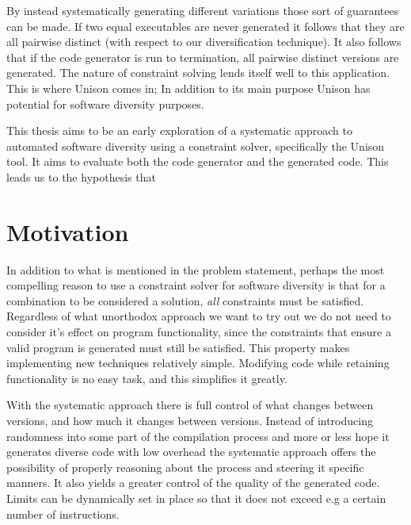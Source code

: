 By instead systematically generating different variations those sort of guarantees can be
made. If two equal executables are never generated it follows that they are all pairwise
distinct (with respect to our diversification technique). It also follows that if the
code generator is run to termination, all pairwise distinct versions are generated.
The nature of constraint solving lends itself well to this application. This is where
Unison comes in; In addition to its main purpose Unison has potential for software
diversity purposes.

This thesis aims to be an early exploration of a systematic approach to automated software
diversity using a constraint solver, specifically the Unison tool. It aims to evaluate 
both the code generator and the generated code. This leads us to the hypothesis that


\section{Motivation}

In addition to what is mentioned in the problem statement, perhaps the most compelling
reason to use a constraint solver for software diversity is that for a combination to be
considered a solution, \textit{all} constraints must be satisfied. Regardless of what
unorthodox approach we want to try out we do not need to consider it's effect on program
functionality, since the constraints that ensure a valid program is generated must still
be satisfied. This property makes implementing new techniques relatively simple. Modifying
code while retaining functionality is no easy task, and this simplifies it greatly.

With the systematic approach there is full control of what changes between versions, and
how much it changes between versions. Instead of introducing randomness into some part of
the compilation process and more or less hope it generates diverse code with low overhead
the systematic approach offers the possibility of properly reasoning about the process and
steering it specific manners. It also yields a greater control of the quality of the
generated code. Limits can be dynamically set in place so that it does not exceed e.g a
certain number of instructions.
